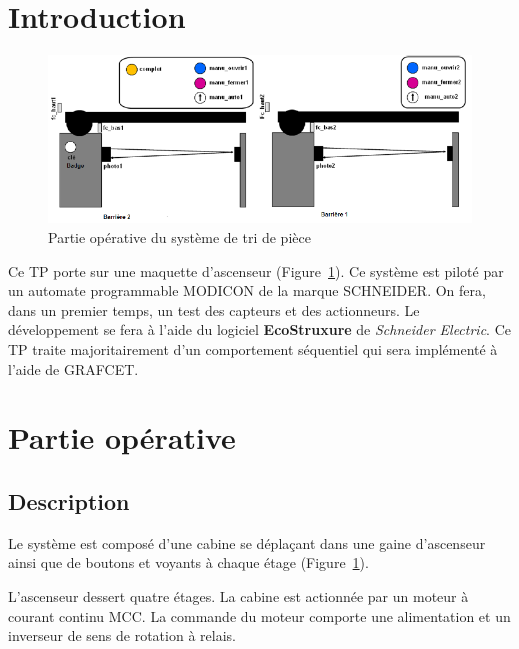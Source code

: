 \documentclass[11pt, multicol]{article}
\begin{document}
\UPSTIbuildPage
{}

\tableofcontents


\section{Introduction}
\begin{figure}[ht]
	\centering
	\includegraphics[width=.63\linewidth]{images/schemaSysteme}
	\caption{Partie opérative du système de tri de pièce}
	\label{fig:schemaPartieOperative}
\end{figure}
Ce TP porte sur une maquette d'ascenseur (Figure~\ref{fig:schemaPartieOperative}). Ce système est piloté par un automate programmable MODICON de la marque SCHNEIDER. On fera, dans un premier temps, un test des capteurs et des actionneurs.
Le développement se fera à l'aide du logiciel \textbf{EcoStruxure} de \textit{Schneider Electric}. Ce TP traite majoritairement d'un comportement séquentiel qui sera implémenté à l'aide de GRAFCET.

\section{Partie opérative}
\subsection{Description}
Le système est composé d'une cabine se déplaçant dans une gaine d'ascenseur ainsi que de boutons et voyants à chaque étage (Figure~\ref{fig:schemaPartieOperative}).

L’ascenseur dessert quatre étages. La cabine est actionnée par un moteur à courant continu MCC.
La commande du moteur comporte une alimentation et un inverseur de sens de rotation à relais.
\end{document}

